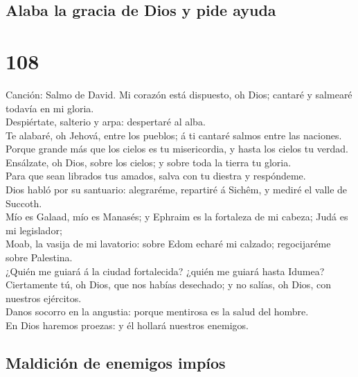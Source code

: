 \hypertarget{alaba-la-gracia-de-dios-y-pide-ayuda}{%
\subsection{Alaba la gracia de Dios y pide
ayuda}\label{alaba-la-gracia-de-dios-y-pide-ayuda}}

\hypertarget{section-107}{%
\section{108}\label{section-107}}

 Canción: Salmo de David. Mi corazón está dispuesto, oh
Dios; cantaré y salmearé todavía en mi gloria.\\
 Despiértate, salterio y arpa: despertaré al alba.\\
 Te alabaré, oh Jehová, entre los pueblos; á ti cantaré
salmos entre las naciones.\\
 Porque grande más que los cielos es tu misericordia, y
hasta los cielos tu verdad.\\
 Ensálzate, oh Dios, sobre los cielos; y sobre toda la
tierra tu gloria.\\
 Para que sean librados tus amados, salva con tu diestra y
respóndeme.\\
 Dios habló por su santuario: alegraréme, repartiré á
Sichêm, y mediré el valle de Succoth.\\
 Mío es Galaad, mío es Manasés; y Ephraim es la fortaleza
de mi cabeza; Judá es mi legislador;\\
 Moab, la vasija de mi lavatorio: sobre Edom echaré mi
calzado; regocijaréme sobre Palestina.\\
 ¿Quién me guiará á la ciudad fortalecida? ¿quién me
guiará hasta Idumea?\\
 Ciertamente tú, oh Dios, que nos habías desechado; y no
salías, oh Dios, con nuestros ejércitos.\\
 Danos socorro en la angustia: porque mentirosa es la
salud del hombre.\\
 En Dios haremos proezas: y él hollará nuestros enemigos.

\hypertarget{maldiciuxf3n-de-enemigos-impuxedos}{%
\subsection{Maldición de enemigos
impíos}\label{maldiciuxf3n-de-enemigos-impuxedos}}

